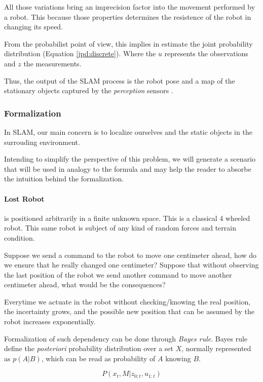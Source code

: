 All those variations bring an imprecision factor into the movement performed by a robot. This because those properties determines the resistence of the robot in changing its speed.

From the probabilist point of view, this implies in estimate the joint probability distribution (Equation \ref{jpd:discrete}). Where the $u$ represents the observations and $z$ the measurements.

Thus, the output of the SLAM process is the robot pose and a map of the stationary objects captured by the \textit{perception} sensors \cite{iyengar1991autonomous}.

\subsubsection{Formalization}

In SLAM, our main concern is to localize ourselves and the static objects in the surrouding environment. 

Intending to simplify the perspective of this problem, we will generate a scenario that will be used in analogy to the formula and may help the reader to absorbe the intuition behind the formalization.

\paragraph*{Lost Robot} is positioned arbitrarily in a finite unknown space. This is a classical 4 wheeled robot. This same robot is subject of any kind of random forces and terrain condition. 

Suppose we send a command to the robot to move one centimeter ahead, how do we ensure that he really changed one centimeter? Suppose that without observing the last position of the robot we send another command to move another centimeter ahead, what would be the consequences? 

Everytime we actuate in the robot without checking/knowing the real position, the incertainty grows, and the possible new position that can be assumed by the robot increases exponentially.

Formalization of such dependency can be done through \textit{Bayes rule}. Bayes rule define the \textit{posteriori} probability distribution over a set $X$, normally represented as $p(A | B)$, which can be read as probability of $A$ knowing $B$.

\begin{equation}
\label{jpd:discrete}
P(x_t,M | z_{0:t}, u_{1:t})
\end{equation}

